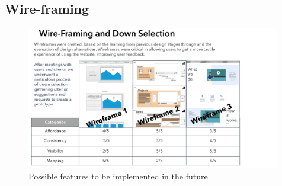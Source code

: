 \documentclass[fontsize=10pt]{extarticle}
\numberwithin{figure}{section} %
\begin{document}
\newpage

\hypertarget{wire-framing}{%
\subsection{Wire-framing}\label{wire-framing}}

\begin{landscape}
\begin{figure}[H]
      \centering
      \includegraphics[trim = 0 0 0 0, clip, width=0.99\textwidth]{app1.png}
      \caption{Possible features to be implemented in the future}
 \end{figure}

 \end{landscape}

\newpage


\newpage
\newpage

% 

\printbibliography
\end{document}
